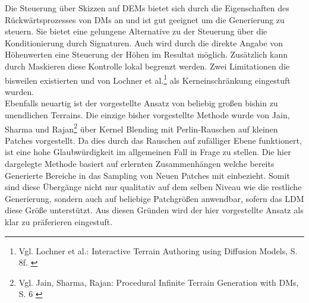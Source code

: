 Die Steuerung über Skizzen auf \ac{DEM}s bietet sich durch die Eigenschaften des Rückwärtsprozesses von \ac{DM}s an und ist gut geeignet um die Generierung zu steuern. Sie bietet eine gelungene Alternative zu der Steuerung über die Konditionierung durch Signaturen. Auch wird durch die direkte Angabe von Höhenwerten eine Steuerung der Höhen im Resultat möglich. Zusätzlich kann durch Maskieren diese Kontrolle lokal begrenzt werden. Zwei Limitationen die bisweilen existierten und von Lochner et al.\footnote{
    Vgl. Lochner et al.: Interactive Terrain Authoring using Diffusion Models, S. 8f.
    \cite{lochner2023interactive}
} als Kerneinschränkung eingestuft wurden. \\
Ebenfalls neuartig ist der vorgestellte Ansatz von beliebig großen bishin zu unendlichen Terrains. Die einzige bisher vorgestellte Methode wurde von Jain, Sharma und Rajan\footnote{
    Vgl. Jain, Sharma, Rajan: Procedural Infinite Terrain Generation with DMs, S. 6
    \cite{jain2022adaptive}
} über Kernel Blending mit Perlin-Rauschen auf kleinen Patches vorgestellt. Da dies durch das Rauschen auf zufälliger Ebene funktionert, ist eine hohe Glaubwürdigkeit im allgemeinen Fall in Frage zu stellen. Die hier dargelegte Methode basiert auf erlernten Zusammenhängen welche bereits Generierte Bereiche in das Sampling von Neuen Patches mit einbezieht. Somit sind diese Übergänge nicht nur qualitativ auf dem selben Niveau wie die restliche Generierung, sondern auch auf beliebige Patchgrößen anwendbar, sofern das \ac{LDM} diese Größe unterstützt. Aus diesen Gründen wird der hier vorgestellte Ansatz als klar zu präferieren eingestuft.  

